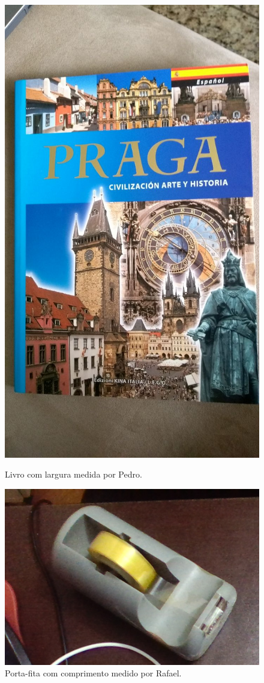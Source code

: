 \documentclass{bmvc2k}
\begin{document}
\begin{figure}
\centering
\begin{minipage}[t]{0.45\textwidth}
  \centering
  \includegraphics[height=\linewidth, angle=90]{figs/objeto_pedro.jpg}
  \caption{Livro com largura medida por Pedro.}
  \label{livro}
\end{minipage}\hfill
\begin{minipage}[t]{0.45\textwidth}
  \centering
  \includegraphics[width=\linewidth]{figs/objeto_rafael.png}
  \caption{Porta-fita com comprimento medido por Rafael.}
  \label{fita}
\end{minipage}
\end{figure}
\end{document}
